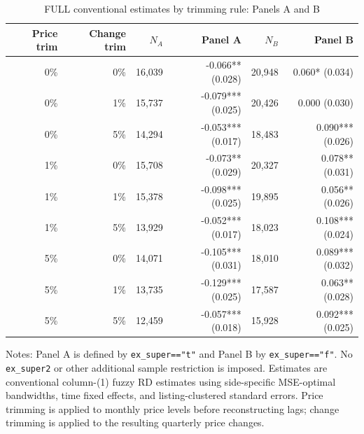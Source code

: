 \begin{table}[!htbp]
\centering
\caption{FULL conventional estimates by trimming rule: Panels A and B}
\label{tab:panels_ab_trim_grid_full}
\small
\begin{tabular}{rrrrrr}
\toprule
Price trim & Change trim & $N_A$ & Panel A & $N_B$ & Panel B \\
\midrule
0\% & 0\% & 16,039 & -0.066** (0.028) & 20,948 & 0.060* (0.034) \\
0\% & 1\% & 15,737 & -0.079*** (0.025) & 20,426 & 0.000 (0.030) \\
0\% & 5\% & 14,294 & -0.053*** (0.017) & 18,483 & 0.090*** (0.026) \\
1\% & 0\% & 15,708 & -0.073** (0.029) & 20,327 & 0.078** (0.031) \\
1\% & 1\% & 15,378 & -0.098*** (0.025) & 19,895 & 0.056** (0.026) \\
1\% & 5\% & 13,929 & -0.052*** (0.017) & 18,023 & 0.108*** (0.024) \\
5\% & 0\% & 14,071 & -0.105*** (0.031) & 18,010 & 0.089*** (0.032) \\
5\% & 1\% & 13,735 & -0.129*** (0.025) & 17,587 & 0.063** (0.028) \\
5\% & 5\% & 12,459 & -0.057*** (0.018) & 15,928 & 0.092*** (0.025) \\
\bottomrule
\end{tabular}
\begin{minipage}{0.95\textwidth}\footnotesize
Notes: Panel A is defined by \texttt{ex\_super=="t"} and Panel B by \texttt{ex\_super=="f"}. No \texttt{ex\_super2} or other additional sample restriction is imposed. Estimates are conventional column-(1) fuzzy RD estimates using side-specific MSE-optimal bandwidths, time fixed effects, and listing-clustered standard errors. Price trimming is applied to monthly price levels before reconstructing lags; change trimming is applied to the resulting quarterly price changes.
\end{minipage}
\end{table}
